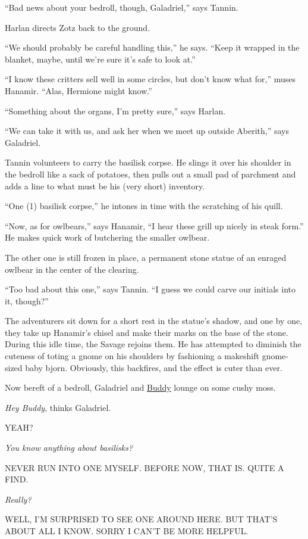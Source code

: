 \documentclass[smalldemyvopaper,11pt,twoside,onecolumn,openright,extrafontsizes]{memoir}
\begin{document}
``Bad news about your bedroll, though, Galadriel,'' says Tannin.

Harlan directs Zotz back to the ground.

``We should probably be careful handling this,'' he says. ``Keep it
wrapped in the blanket, maybe, until we're sure it's safe to look at.''

``I know these critters sell well in some circles, but don't know what
for,'' muses Hanamir. ``Alas, Hermione might know.''

``Something about the organs, I'm pretty sure,'' says Harlan.

``We can take it with us, and ask her when we meet up outside Aberith,''
says Galadriel.

Tannin volunteers to carry the basilisk corpse. He slings it over his
shoulder in the bedroll like a sack of potatoes, then pulls out a small
pad of parchment and adds a line to what must be his (very short)
inventory.

``One (1) basilisk corpse,'' he intones in time with the scratching of
his quill.

``Now, as for owlbears,'' says Hanamir, ``I hear these grill up nicely
in steak form.'' He makes quick work of butchering the smaller owlbear.

The other one is still frozen in place, a permanent stone statue of an
enraged owlbear in the center of the clearing.

``Too bad about this one,'' says Tannin. ``I guess we could carve our
initials into it, though?''

The adventurers sit down for a short rest in the statue's shadow, and
one by one, they take up Hanamir's chisel and make their marks on the
base of the stone. During this idle time, the Savage rejoins them. He
has attempted to diminish the cuteness of toting a gnome on his
shoulders by fashioning a makeshift gnome-sized baby bjorn. Obviously,
this backfires, and the effect is cuter than ever.

Now bereft of a bedroll, Galadriel and \href{/characters/buddy/}{Buddy}
lounge on some cushy moss.

\emph{Hey Buddy}, thinks Galadriel.

YEAH?

\emph{You know anything about basilisks?}

NEVER RUN INTO ONE MYSELF. BEFORE NOW, THAT IS. QUITE A FIND.

\emph{Really?}

WELL, I'M SURPRISED TO SEE ONE AROUND HERE. BUT THAT'S ABOUT ALL I KNOW.
SORRY I CAN'T BE MORE HELPFUL.
\end{document}
